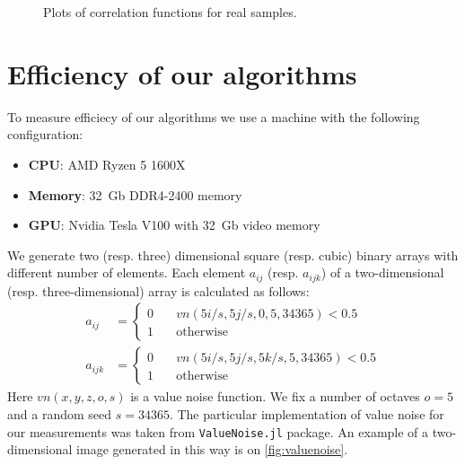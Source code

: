 \documentclass[reprint,amsmath,amssymb,aps,pre,showkeys,showpacs,nofootinbib]{revtex4-1}
\newcommand{\code}[1]{\colorbox{light-gray}{\texttt{#1}}}
\begin{document}
\begin{figure}[pt]
{    \label{fig:real-sandstone-2-plt}}
  \hfill
  \caption[]{Plots of correlation functions for real samples.}
  \label{fig:real-data}
\end{figure}

\section{Efficiency of our algorithms}
\label{sec:efficiency}
To measure efficiecy of our algorithms we use a machine with the following
configuration:
\begin{itemize}
\item \textbf{CPU}: AMD Ryzen 5 1600X
\item \textbf{Memory}: 32~Gb DDR4-2400 memory
\item \textbf{GPU}: Nvidia Tesla V100 with 32~Gb video memory
\end{itemize}

We generate two (resp. three) dimensional square (resp. cubic) binary arrays
with different number of elements. Each element $a_{ij}$ (resp. $a_{ijk}$) of a
two-dimensional (resp. three-dimensional) array is calculated as follows:
\begin{align*}
  a_{ij} & = \left\{
  \begin{array}{ll}
    0 & \quad vn(5i/s, 5j/s, 0, 5, 34365) < 0.5 \\
    1 & \quad \text{otherwise}
  \end{array}
  \right. \\
  a_{ijk} & = \left\{
  \begin{array}{ll}
    0 & \quad vn(5i/s, 5j/s, 5k/s, 5, 34365) < 0.5 \\
    1 & \quad \text{otherwise}
  \end{array}
  \right.
\end{align*}
Here $vn(x,y,z,o,s)$ is a value noise function. We fix a number of
octaves $o = 5$ and a random seed $s = 34365$. The particular implementation of
value noise for our measurements was taken from \code{ValueNoise.jl} package. An
example of a two-dimensional image generated in this way is on
\cref{fig:valuenoise}.
\end{document}
